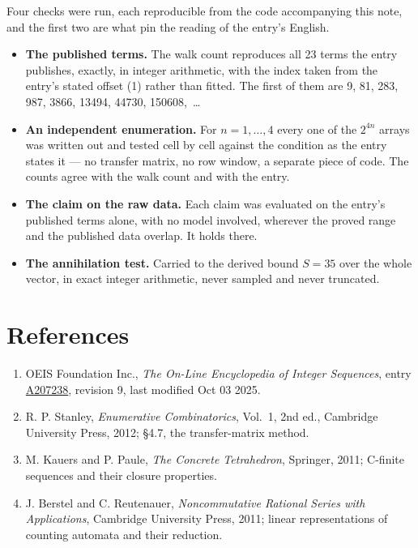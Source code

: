 \documentclass[11pt]{article}
\theoremstyle{definition}
\begin{document}
Four checks were run, each reproducible from the code accompanying this note, and the first two are what pin the reading of the entry's English.

\begin{itemize}

\item {\bfseries The published terms.} The walk count reproduces all 23 terms the entry publishes, exactly, in integer arithmetic, with the index taken from the entry's stated offset (1) rather than fitted. The first of them are 9, 81, 283, 987, 3866, 13494, 44730, 150608,~\dots

\item {\bfseries An independent enumeration.} For $n = 1,\dots,4$ every one of the $2^{4n}$ arrays was written out and tested cell by cell against the condition as the entry states it --- no transfer matrix, no row window, a separate piece of code. The counts agree with the walk count and with the entry.

\item {\bfseries The claim on the raw data.} Each claim was evaluated on the entry's published terms alone, with no model involved, wherever the proved range and the published data overlap. It holds there.

\item {\bfseries The annihilation test.} Carried to the derived bound $S = 35$ over the whole vector, in exact integer arithmetic, never sampled and never truncated.

\end{itemize}

\section{References}

\begin{enumerate}

\item OEIS Foundation Inc., \emph{The On-Line Encyclopedia of Integer Sequences}, entry \href{https://oeis.org/A207238}{A207238}, revision 9, last modified Oct 03 2025.

\item R. P. Stanley, \emph{Enumerative Combinatorics}, Vol.~1, 2nd ed., Cambridge University Press, 2012; \S4.7, the transfer-matrix method.

\item M. Kauers and P. Paule, \emph{The Concrete Tetrahedron}, Springer, 2011; C-finite sequences and their closure properties.

\item J. Berstel and C. Reutenauer, \emph{Noncommutative Rational Series with Applications}, Cambridge University Press, 2011; linear representations of counting automata and their reduction.

\end{enumerate}
\end{document}
